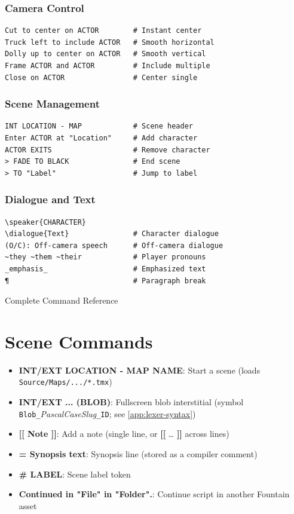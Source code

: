 \documentclass[11pt,letterpaper,oldstylefigures]{memoir}
\makeatletter
\newcommand{\speaker}[1]{\nobreak\hspace*{0.333\textwidth}\MakeUppercase{#1}\par\nobreak\vspace{0.5\baselineskip}}
\newcommand{\dialogue}[1]{\nobreak\hspace*{0.25\textwidth}\begin{minipage}{0.5\textwidth}#1\end{minipage}\par\vspace{1\baselineskip}}
\let\oldchapter\chapter
\def\chapter{%
  \@ifstar
    {\FountainScripting@starchapter}%
    {\@dblarg\FountainScripting@chapter}}
\def\FountainScripting@starchapter#1{\oldchapter*{#1}\chaptermark{#1}}
\def\FountainScripting@chapter[#1]#2{\oldchapter[#1]{#2}\chaptermark{#2}}
\newcommand{\fountain}[1]{\textbf{#1}}
\makeatother
\begin{document}
\subsubsection{Camera Control}
\begin{verbatim}
Cut to center on ACTOR        # Instant center
Truck left to include ACTOR   # Smooth horizontal
Dolly up to center on ACTOR   # Smooth vertical
Frame ACTOR and ACTOR         # Include multiple
Close on ACTOR                # Center single
\end{verbatim}

\subsubsection{Scene Management}
\begin{verbatim}
INT LOCATION - MAP            # Scene header
Enter ACTOR at "Location"     # Add character
ACTOR EXITS                   # Remove character
> FADE TO BLACK               # End scene
> TO "Label"                  # Jump to label
\end{verbatim}

\subsubsection{Dialogue and Text}
\begin{verbatim}
\speaker{CHARACTER}
\dialogue{Text}               # Character dialogue
(O/C): Off-camera speech      # Off-camera dialogue
~they ~them ~their            # Player pronouns
_emphasis_                    # Emphasized text
¶                             # Paragraph break
\end{verbatim}

\chapter{Complete Command Reference}

\section{Scene Commands}
\begin{itemize}
\item \fountain{INT/EXT LOCATION - MAP NAME}: Start a scene (loads \texttt{Source/Maps/.../*.tmx})
\item \fountain{INT/EXT ... (BLOB)}: Fullscreen blob interstitial (symbol \texttt{Blob\_}\textit{PascalCaseSlug}\texttt{\_ID}; see \autoref{app:lexer-syntax})
\item \fountain{[[ Note ]]}: Add a note (single line, or \fountain{[[} \ldots{} \fountain{]]} across lines)
\item \fountain{= Synopsis text}: Synopsis line (stored as a compiler comment)
\item \fountain{\# LABEL}: Scene label token
\item \fountain{Continued in "File" in "Folder".}: Continue script in another Fountain asset
\end{itemize}
\end{document}
